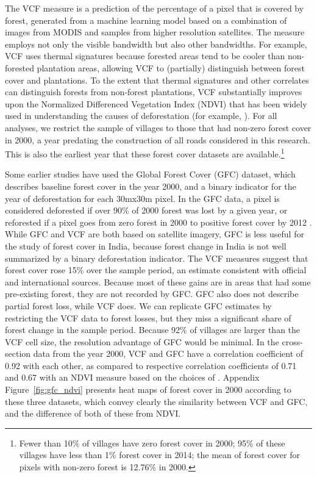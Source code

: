 The VCF measure is a prediction of the percentage of a pixel that is
covered by forest, generated from a machine learning model based on a
combination of images from MODIS and samples from
higher resolution satellites. The measure employs not only the visible
bandwidth but also other bandwidths. For example, VCF uses thermal
signatures because forested areas tend to be cooler than non-forested
plantation areas, allowing VCF to (partially) distinguish between
forest cover and plantations. To the extent that thermal signatures
and other correlates can distinguish forests from non-forest
plantations, VCF substantially improves upon the Normalized
Differenced Vegetation Index (NDVI) that has been widely used in
understanding the causes of deforestation (for example,
). For all analyses, we restrict the sample of
villages to those that had non-zero forest cover in 2000, a year
predating the construction of all roads considered in this
research. This is also the earliest year that these forest cover
datasets are available.\footnote{Fewer than 10\% of villages have zero
  forest cover in 2000; 95\% of these villages have less than 1\%
  forest cover in 2014; the mean of forest cover for pixels with
  non-zero forest is 12.76\% in 2000.}

Some earlier studies have used the Global Forest Cover (GFC) dataset,
which describes baseline forest cover in the year 2000, and a binary
indicator for the year of deforestation for each 30mx30m pixel.  In
the GFC data, a pixel is considered deforested if over 90\% of 2000
forest was lost by a given year, or reforested if a pixel goes from
zero forest in 2000 to positive forest cover by 2012 \cite{H13}. While
GFC and VCF are both based on satellite imagery, GFC is less useful
for the study of forest cover in India, because forest change in India
is not well summarized by a binary deforestation indicator. The VCF
measures suggest that forest cover rose 15\% over the sample period,
an estimate consistent with official and international
sources. Because most of these gains are in areas that had some
pre-existing forest, they are not recorded by GFC. GFC also does not
describe partial forest loss, while VCF does. We can replicate GFC
estimates by restricting the VCF data to forest losses, but they miss
a significant share of forest change in the sample period. Because
92\% of villages are larger than the VCF cell size, the resolution
advantage of GFC would be minimal. In the cross-section data from the
year 2000, VCF and GFC have a correlation coefficient of 0.92 with
each other, as compared to respective correlation coefficients of 0.71
and 0.67 with an NDVI measure based on the choices of
. Appendix Figure~\ref{fig:gfc_ndvi} presents heat
maps of forest cover in 2000 according to these three datasets, which
convey clearly the similarity between VCF and GFC, and the difference
of both of these from NDVI.

